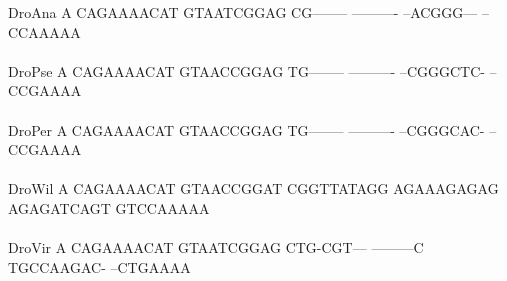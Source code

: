 \documentclass[11pt,twoside,reqno,a4paper]{article}
\begin{document}
{DroAna	A	CAGAAAACAT	GTAATCGGAG	CG--------	----------	--ACGGG---	--CCAAAAA\\
\hspace*{7\charwidth}\hspace*{1\charwidth}\hspace*{1\charwidth}\hspace*{1\charwidth}\hspace*{1\charwidth}\hspace*{1\charwidth}\hspace*{1\charwidth}\\
DroPse	A	CAGAAAACAT	GTAACCGGAG	TG--------	----------	--CGGGCTC-	--CCGAAAA\\
\hspace*{7\charwidth}\hspace*{1\charwidth}\hspace*{1\charwidth}\hspace*{1\charwidth}\hspace*{1\charwidth}\hspace*{1\charwidth}\hspace*{1\charwidth}\\
DroPer	A	CAGAAAACAT	GTAACCGGAG	TG--------	----------	--CGGGCAC-	--CCGAAAA\\
\hspace*{7\charwidth}\hspace*{1\charwidth}\hspace*{1\charwidth}\hspace*{1\charwidth}\hspace*{1\charwidth}\hspace*{1\charwidth}\hspace*{1\charwidth}\\
DroWil	A	CAGAAAACAT	GTAACCGGAT	CGGTTATAGG	AGAAAGAGAG	AGAGATCAGT	GTCCAAAAA\\
\hspace*{7\charwidth}\hspace*{1\charwidth}\hspace*{1\charwidth}\hspace*{1\charwidth}\hspace*{1\charwidth}\hspace*{1\charwidth}\hspace*{1\charwidth}\\
DroVir	A	CAGAAAACAT	GTAATCGGAG	CTG-CGT---	---------C	TGCCAAGAC-	--CTGAAAA\\
\hspace*{7\charwidth}\hspace*{1\charwidth}\hspace*{1\charwidth}\hspace*{1\charwidth}\hspace*{1\charwidth}\hspace*{1\charwidth}\hspace*{1\charwidth}\\
}
\end{document}
